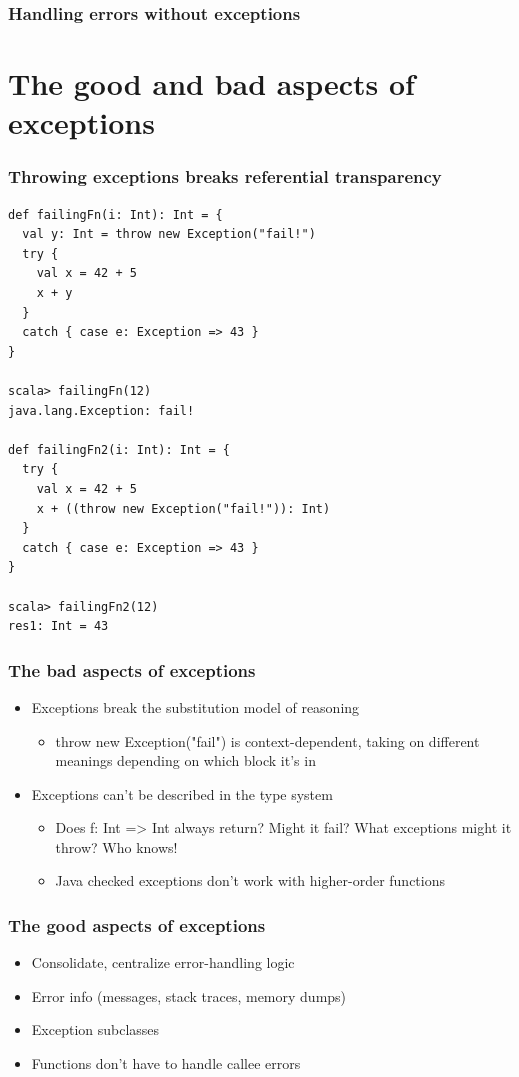 \documentclass{beamer}
\renewcommand{\subject}{Handling errors without exceptions}
\begin{document}
\begin{frame}
\frametitle{\subject}
\tableofcontents
\end{frame}

\section{The good and bad aspects of exceptions}

\begin{frame}[fragile]
  \frametitle{Throwing exceptions breaks referential transparency}
\begin{lstlisting}
def failingFn(i: Int): Int = {
  val y: Int = throw new Exception("fail!")
  try {
    val x = 42 + 5
    x + y
  }
  catch { case e: Exception => 43 }
}

scala> failingFn(12)
java.lang.Exception: fail!

def failingFn2(i: Int): Int = {
  try {
    val x = 42 + 5
    x + ((throw new Exception("fail!")): Int)
  }
  catch { case e: Exception => 43 }
}

scala> failingFn2(12)
res1: Int = 43
\end{lstlisting}
\end{frame}

\begin{frame}
  \frametitle{The bad aspects of exceptions}
  \begin{itemize}
    \item Exceptions break the substitution model of reasoning
      \begin{itemize}
        \item {\ttfamily throw new Exception("fail")} is context-dependent,
          taking on different meanings depending on which block it's in
      \end{itemize}
    \item Exceptions can't be described in the type system
    \begin{itemize}
      \item Does {\ttfamily f: Int => Int} always return? Might it fail? What exceptions might it throw? Who knows!
      \item Java checked exceptions don't work with higher-order functions
    \end{itemize}
  \end{itemize}
\end{frame}

\begin{frame}
  \frametitle{The good aspects of exceptions}
  \begin{itemize}
    \item Consolidate, centralize error-handling logic
    \item Error info (messages, stack traces, memory dumps)
    \item Exception subclasses
    \item Functions don't have to handle callee errors
  \end{itemize}
\end{frame}
\end{document}
